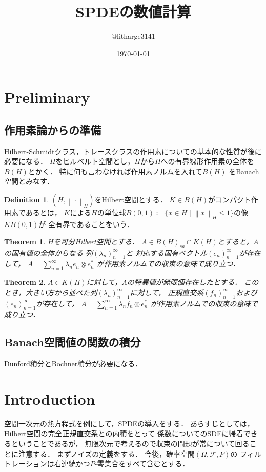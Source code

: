 \documentclass[dvipdfmx,autodetect-engine]{jsarticle}
\newtheorem{theorem}{Theorem}[section]
\theoremstyle{remark}
\theoremstyle{definition}
\newtheorem{definition}{Definition}[section]
\newcommand{\norm}[1]{\left\lVert#1\right\rVert}
\begin{document}
\title{SPDEの数値計算}
\author{@litharge3141}
\date{\today}
\maketitle

\section{Preliminary}

\subsection{作用素論からの準備}
Hilbert-Schmidtクラス，トレースクラスの作用素についての基本的な性質が後に必要になる．
$H$をヒルベルト空間とし，$H$から$H$への有界線形作用素の全体を$B(H)$とかく．
特に何も言わなければ作用素ノルムを入れて$B(H)$
をBanach空間とみなす．


\begin{definition}
    $(H,\norm{\cdot}_{H})$をHilbert空間とする．
    $K \in B(H)$がコンパクト作用素であるとは，
    $K$による$H$の単位球$B(0,1) 
    \coloneqq \{x \in H \mid \norm{x}_{H} \leq 1\}$の像$KB(0,1)$が
    全有界であることをいう．
\end{definition}


\begin{theorem}
    $H$を可分Hilbert空間とする．
    $A \in B(H)_{sa} \cap K(H)$とすると，$A$の固有値の全体からなる
    列$(\lambda_{n})_{n=1}^{\infty}$と
    対応する固有ベクトル$(e_{n})_{n=1}^{\infty}$が存在して，
    $A = \sum_{n=1}^{\infty} \lambda_{n} e_{n} \otimes e_{n}^{*}$
    が作用素ノルムでの収束の意味で成り立つ．
\end{theorem}


\begin{theorem}
    $A \in K(H)$に対して，$A$の特異値が無限個存在したとする．
    このとき，大きい方から並べた列$(\lambda_{n})_{n=1}^{\infty}$に対して，
    正規直交系$(f_{n})_{n=1}^{\infty}$および$(e_{n})_{n=1}^{\infty}$が存在して，
    $A = \sum_{n=1}^{\infty} \lambda_{n} f_{n} \otimes e_{n}^{*}$
    が作用素ノルムでの収束の意味で成り立つ．
\end{theorem}

\subsection{Banach空間値の関数の積分}
Dunford積分とBochner積分が必要になる．

\section{Introduction}
空間一次元の熱方程式を例にして，SPDEの導入をする．
あらすじとしては，Hilbert空間の完全正規直交系との内積をとって
係数についてのSDEに帰着できるということであるが，
無限次元で考えるので収束の問題が常について回ることに注意する．
まずノイズの定義をする．
今後，確率空間$(\Omega,\mathcal{F},P)$の
フィルトレーションは右連続かつ$P$-零集合をすべて含むとする．
\end{document}
